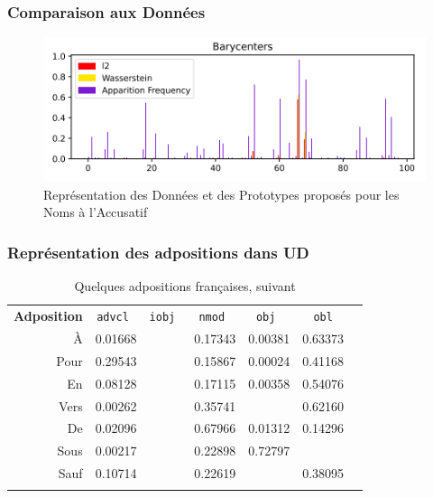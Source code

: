 \documentclass[noamsthm]{beamercours}
\begin{document}
\begin{frame}
	\frametitle{Comparaison aux Données}
	\begin{figure}
\centering
\includegraphics[width=\linewidth]{Figures/Visualisations/Nouns_Wasserstein_Barycenter_Acc_Barys}
\caption{Représentation des Données et des Prototypes proposés pour les Noms à l'Accusatif}
\label{fig_proto}
\end{figure}
\end{frame}


\begin{frame}
\frametitle{Représentation des adpositions dans UD}\label{subsec:adpos}
\begin{table}
	\centering
	\renewcommand{\arraystretch}{1.3}
	\begin{NiceTabular}{>{\sc}rcccccc}
		\bf Adposition & \tt advcl &\tt iobj & \tt nmod & \tt obj & \tt obl\\
		À    & 0.01668 &  & 0.17343 & 0.00381 & 0.63373\\

		Pour & 0.29543 & & 0.15867   & 0.00024 & 0.41168\\
		En   & 0.08128 &  & 0.17115  & 0.00358 & 0.54076\\
		Vers & 0.00262 &  & 0.35741  & & 0.62160\\

		De   & 0.02096 &  & 0.67966  & 0.01312 & 0.14296\\
		Sous & 0.00217 & & 0.22898 & 0.72797 & \\
		Sauf & 0.10714 & & 0.22619 & & 0.38095\\
	\CodeAfter
	\end{NiceTabular}
	\caption{Quelques adpositions françaises, suivant \cite{morphenglish}}
	\label{tab:adpos_fr}
\end{table}

\end{frame}
\end{document}
